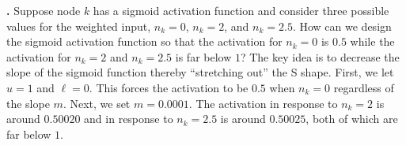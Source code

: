 \bigskip

\noindent
{\bf \theActFunctionCounter.} Suppose node $k$ has a sigmoid activation function and 
consider three possible values for the weighted input, \ie $n_k=0$, $n_k = 2$, and 
$n_k=2.5$. How can we design the sigmoid activation function so that the 
activation for $n_k=0$ is $0.5$ while the activation for $n_k = 2$ and 
$n_k=2.5$ is far below $1$?  The key idea is to decrease the slope of the 
sigmoid function thereby ``stretching out'' the S shape. First, we let $u=1$ 
and $\ell=0$. This forces the activation to be $0.5$ when $n_k=0$ regardless 
of the slope $m$. Next, we set $m=0.0001$. The activation in response to 
$n_k=2$ is around $0.50020$ and in response to $n_k=2.5$ is around $0.50025$, 
both of which are far below $1$.

\bigskip
